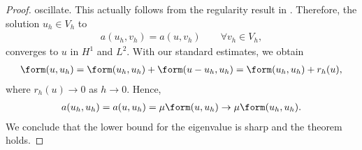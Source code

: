 \begin{proof}
  oscillate. This actually follows from the regularity result in
  . Therefore, the solution $u_h\in V_h$ to
  \begin{gather}
    a(u_h, v_h) = a(u,v_h) \qquad\forall v_h\in V_h,
  \end{gather}
  converges to $u$ in $H^1$ and $L^2$. With our standard estimates, we obtain
  \begin{gather}
    \form(u, u_h)
    = \form(u_h,u_h) + \form(u-u_h,u_h)
    = \form(u_h,u_h) + r_h(u),
  \end{gather}
  where $r_h(u)\to 0$ as $h\to 0$. Hence,
  \begin{gather}
    a(u_h,u_h) = a(u,u_h) = \mu \form(u,u_h) \to \mu \form(u_h,u_h).
  \end{gather}
  We conclude that the lower bound for the eigenvalue is sharp and the
  theorem holds.
\end{proof}

